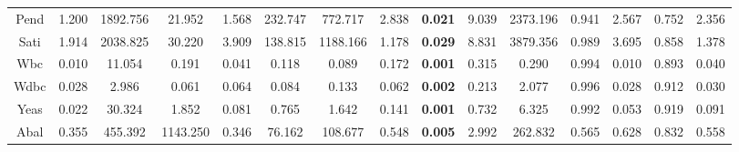 \documentclass[times, review, 10pt]{elsarticle}
\begin{document}
\begin{table}[!htb]
{\begin{tabular}{@{}ccccccccccccccc@{}}
{ Pend}    & { 1.200}                     & { 1892.756}                    & { 21.952}                      & { 1.568}                     & { 232.747}                    & { 772.717}                     & { 2.838}                     & { \textbf{0.021}}                     & { 9.039}                     & { 2373.196}                     & { 0.941}                     & { 2.567}                     & { 0.752}                     & { 2.356}        \\
{ Sati}    & { 1.914}                     & { 2038.825}                    & { 30.220}                      & { 3.909}                     & { 138.815}                    & { 1188.166}                    & { 1.178}                     & { \textbf{0.029}}                     & { 8.831}                     & { 3879.356}                     & { 0.989}                     & { 3.695}                     & { 0.858}                     & { 1.378}        \\
{ Wbc}     & { 0.010}                     & { 11.054}                      & { 0.191}                       & { 0.041}                     & { 0.118}                      & { 0.089}                       & { 0.172}                     & { \textbf{0.001}}                     & { 0.315}                     & { 0.290}                        & { 0.994}                     & { 0.010}                     & { 0.893}                     & { 0.040}        \\
{ Wdbc}    & { 0.028}                     & { 2.986}                       & { 0.061}                       & { 0.064}                     & { 0.084}                      & { 0.133}                       & { 0.062}                     & { \textbf{0.002}}                     & { 0.213}                     & { 2.077}                        & { 0.996}                     & { 0.028}                     & { 0.912}                     & { 0.030}        \\
{ Yeas}    & { 0.022}                     & { 30.324}                      & { 1.852}                       & { 0.081}                     & { 0.765}                      & { 1.642}                       & { 0.141}                     & { \textbf{0.001}}                     & { 0.732}                     & { 6.325}                        & { 0.992}                     & { 0.053}                     & { 0.919}                     & { 0.091}        \\
{ Abal}    & { 0.355}                     & { 455.392}                     & { 1143.250}                    & { 0.346}                     & { 76.162}                     & { 108.677}                     & { 0.548}                     & { \textbf{0.005}}                     & { 2.992}                     & { 262.832}                      & { 0.565}                     & { 0.628}                     & { 0.832}                     & { 0.558}        \\

\end{tabular}}
\end{table}
\end{document}
